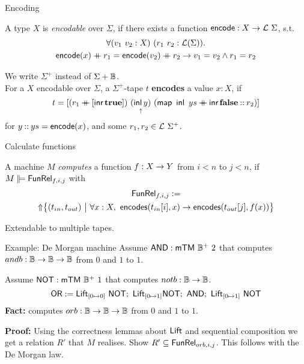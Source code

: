 \begin{frame}{Encoding}
  \begin{definition}
    A type $X$ is \emph{encodable} over $\Sigma$, if there exists a function $\textsf{encode} : X \rightarrow \mathcal{L}~\Sigma$, s.t.
    \begin{multline*}
      \forall (v_1~v_2:X)~(r_1~r_2: \mathcal{L}(\Sigma)). \\
      \textsf{encode}(x) \mathbin{+\mkern-10mu+} r_1 = \textsf{encode}(v_2) \mathbin{+\mkern-10mu+} r_2 \rightarrow
      v_1 = v_2 \land r_1 = r_2
    \end{multline*}
  \end{definition}
  \pause%
  \begin{definition}
    We write $\Sigma^+$ instead of $\Sigma + \mathbb{B}$. \\
    For a $X$ encodable over $\Sigma$, a $\Sigma^+$-tape $t$ \textbf{encodes} a value $x:X$, if
    \[t = [ (r_1 \mathbin{+\mkern-10mu+} [\operatorname{\textsf{inr}} \mathbf{true}])~\underset{\uparrow}{(\operatorname{\textsf{inl}} y)}~(\textsf{map}~\operatorname{\textsf{inl}}~ys \mathbin{+\mkern-10mu+} \operatorname{\textsf{inr}} \mathbf{false} \mathbin{::} r_2) ]\]
    for $y \mathbin{::} ys = \textsf{encode}(x)$, and some $r_1, r_2 \in \mathcal{L}~\Sigma^+$.
  \end{definition}
\end{frame}

\begin{frame}{Calculate functions}
  \begin{definition}
    A machine $M$ \emph{computes} a function $f : X \rightarrow Y$ from $i < n$ to $j < n$, if $M \VDash \MS{FunRel}_{f,i,j}$ with
    \begin{multline*}
      \textsf{FunRel}_{f,i,j} := \\
      \operatorname{\Uparrow} \bigl\{ (t_{in}, t_{out})~\big|~
      \forall x:X,~ \textsf{encodes}(t_{in}[i], x) \rightarrow \textsf{encodes}(t_{out}[j], f(x)) \bigr \}
    \end{multline*}
  \end{definition}
  \pause%
  Extendable to multiple tapes.
\end{frame}

\begin{frame}{Example: De Morgan machine}
  Assume $\textsf{AND} : \textsf{mTM}~\mathbb{B}^+~2$ that computes $andb : \mathbb{B} \rightarrow \mathbb{B} \rightarrow \mathbb{B}$ from $0$ and $1$ to $1$.

  Assume $\textsf{NOT} : \textsf{mTM}~\mathbb{B}^+~1$ that computes $notb : \mathbb{B} \rightarrow \mathbb{B}$.
  \[
    \textsf{OR} := \textsf{Lift}_{[0 \mapsto 0]}~\textsf{NOT} ;~ \textsf{Lift}_{[0 \mapsto 1]} \textsf{NOT} ;~ \textsf{AND} ;~ \textsf{Lift}_{[0 \mapsto 1]}~\textsf{NOT}
  \]
  \pause%
  \textbf{Fact:}  computes $orb : \mathbb{B} \rightarrow \mathbb{B} \rightarrow \mathbb{B}$ from $0$ and $1$ to $1$.

  \textbf{Proof:}
  Using the correctness lemmas about $\textsf{Lift}$ and sequential composition we get a relation $R'$ that $M$ realises.
  Show $R' \subseteq \textsf{FunRel}_{orb,i,j}$.
  This follows with the De Morgan law.
\end{frame}

